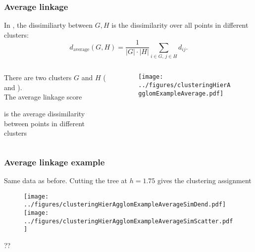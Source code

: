 \documentclass{beamer}
\begin{document}
\begin{frame}
\frametitle{Average linkage}
In , the dissimiliarty between $G,H$ is the  
dissimilarity over all points in different clusters:
\[
d_{\textrm{average}}(G,H) = \frac{1}{|G| \cdot |H| }\sum_{i \in G, \,j \in H} d_{ij}.
\]
\begin{columns}[T]
\begin{column}{.52\textwidth}
\vsp


 There are two clusters $G$ and $H$ ( and ).  \\ The average linkage
score 


is the average dissimilarity between  points in different clusters


\end{column}
\begin{column}{.48\textwidth}
\begin{figure}[h!]
  \centering
  \texttt{[image: ../figures/clusteringHierAgglomExampleAverage.pdf]}
\end{figure}
\end{column}
\end{columns}
\end{frame}

\begin{frame}
\frametitle{Average linkage example}
Same data as before.  Cutting the tree at $h= 1.75$ gives the clustering assignment
\begin{figure}[h!]
  \centering
  \texttt{[image: ../figures/clusteringHierAgglomExampleAverageSimDend.pdf]}
  \texttt{[image: ../figures/clusteringHierAgglomExampleAverageSimScatter.pdf]}  
\end{figure}
 ??

\end{frame}
\end{document}
